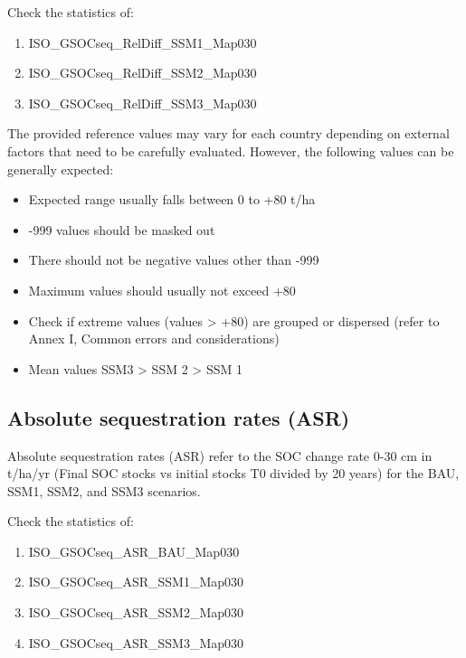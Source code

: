 \documentclass[
  10pt,
  b5paper,
]{book}
\providecommand{\tightlist}{%
  \setlength{\itemsep}{0pt}\setlength{\parskip}{0pt}}
\begin{document}
Check the statistics of:

\begin{enumerate}
\def\labelenumi{\arabic{enumi}.}
\tightlist
\item
  ISO\_GSOCseq\_RelDiff\_SSM1\_Map030
\item
  ISO\_GSOCseq\_RelDiff\_SSM2\_Map030
\item
  ISO\_GSOCseq\_RelDiff\_SSM3\_Map030
\end{enumerate}

The provided reference values may vary for each country depending on external factors that need to be carefully evaluated. However, the following values can be generally expected:

\begin{itemize}
\tightlist
\item
  Expected range usually falls between 0 to +80 t/ha
\item
  -999 values should be masked out
\item
  There should not be negative values other than -999
\item
  Maximum values should usually not exceed +80
\item
  Check if extreme values (values \textgreater{} +80) are grouped or dispersed (refer to Annex I, Common errors and considerations)
\item
  Mean values SSM3 \textgreater{} SSM 2 \textgreater{} SSM 1
\end{itemize}

\hypertarget{absolute-sequestration-rates-asr}{%
\subsection*{Absolute sequestration rates (ASR)}\label{absolute-sequestration-rates-asr}}

Absolute sequestration rates (ASR) refer to the SOC change rate 0-30 cm in t/ha/yr (Final SOC stocks vs initial stocks T0 divided by 20 years) for the BAU, SSM1, SSM2, and SSM3 scenarios.

Check the statistics of:

\begin{enumerate}
\def\labelenumi{\arabic{enumi}.}
\tightlist
\item
  ISO\_GSOCseq\_ASR\_BAU\_Map030
\item
  ISO\_GSOCseq\_ASR\_SSM1\_Map030
\item
  ISO\_GSOCseq\_ASR\_SSM2\_Map030
\item
  ISO\_GSOCseq\_ASR\_SSM3\_Map030
\end{enumerate}
\end{document}
